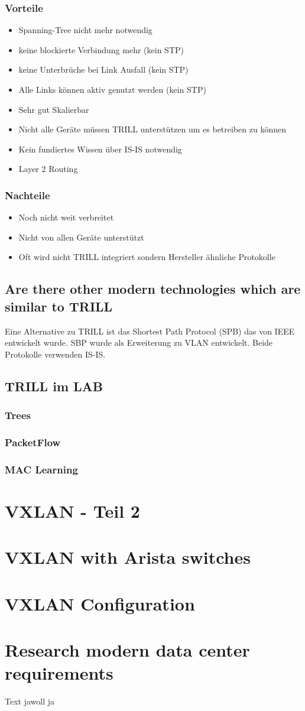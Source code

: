 \documentclass[a4,12pt]{scrartcl}
\begin{document}
\subsubsection{Vorteile}
\begin{itemize}
\item Spanning-Tree nicht mehr notwendig 
\item keine blockierte Verbindung mehr (kein STP) 
\item keine Unterbrüche bei Link Ausfall (kein STP)
\item Alle Links können aktiv genutzt werden (kein STP) 
\item Sehr gut Skalierbar 
\item Nicht alle Geräte müssen TRILL unterstützen um es betreiben zu können
\item Kein fundiertes Wissen über IS-IS notwendig   
\item Layer 2 Routing 
\end{itemize}
\subsubsection{Nachteile}
\begin{itemize}
\item Noch nicht weit verbreitet 
\item Nicht von allen Geräte unterstützt 
\item Oft wird nicht TRILL integriert sondern Hersteller ähnliche Protokolle 
\end{itemize}

\subsection{Are there other modern technologies which are similar to TRILL} 
Eine Alternative zu TRILL ist das Shortest Path Protocol (SPB) das von IEEE entwickelt wurde. SBP wurde als Erweiterung zu VLAN entwickelt. Beide Protokolle verwenden IS-IS. 
\newpage
\subsection{TRILL im LAB}
\subsubsection{Trees}
\subsubsection{PacketFlow}
\subsubsection{MAC Learning} 
\newpage
\section{VXLAN - Teil 2}
\section{VXLAN with Arista switches}
\section{VXLAN Configuration}
\section{Research modern data center requirements}
Text jawoll ja
\end{document}
